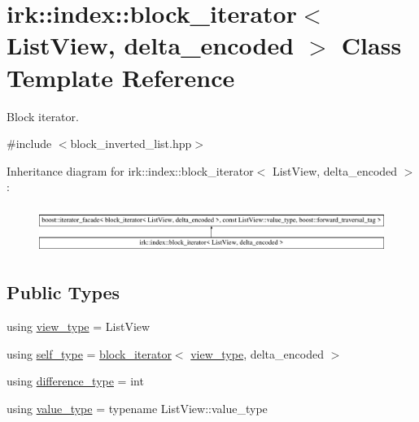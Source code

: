 \hypertarget{classirk_1_1index_1_1block__iterator}{}\section{irk\+:\+:index\+:\+:block\+\_\+iterator$<$ List\+View, delta\+\_\+encoded $>$ Class Template Reference}
\label{classirk_1_1index_1_1block__iterator}


Block iterator.  




{\ttfamily \#include $<$block\+\_\+inverted\+\_\+list.\+hpp$>$}

Inheritance diagram for irk\+:\+:index\+:\+:block\+\_\+iterator$<$ List\+View, delta\+\_\+encoded $>$\+:\begin{figure}[H]
\begin{center}
\leavevmode
\includegraphics[height=1.523810cm]{classirk_1_1index_1_1block__iterator}
\end{center}
\end{figure}
\subsection*{Public Types}
\begin{DoxyCompactItemize}
\item 
using \mbox{\hyperlink{classirk_1_1index_1_1block__iterator_a75bc89b691db97f719af7284ee91afa0}{view\+\_\+type}} = List\+View
\item 
using \mbox{\hyperlink{classirk_1_1index_1_1block__iterator_a338ee8fee726492e9f8bbad4b4d75766}{self\+\_\+type}} = \mbox{\hyperlink{classirk_1_1index_1_1block__iterator}{block\+\_\+iterator}}$<$ \mbox{\hyperlink{classirk_1_1index_1_1block__iterator_a75bc89b691db97f719af7284ee91afa0}{view\+\_\+type}}, delta\+\_\+encoded $>$
\item 
using \mbox{\hyperlink{classirk_1_1index_1_1block__iterator_abb90b6c7a6100113770359e6eb9dd8cf}{difference\+\_\+type}} = int
\item 
using \mbox{\hyperlink{classirk_1_1index_1_1block__iterator_a4d6c5b58cedd871e8a8f235e425e8587}{value\+\_\+type}} = typename List\+View\+::value\+\_\+type
\end{DoxyCompactItemize}
